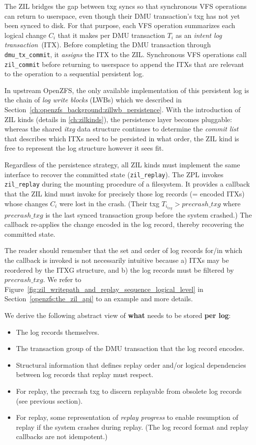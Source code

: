 \documentclass[12pt,a4paper,twoside]{book}
\begin{document}
{The ZIL bridges the gap between txg syncs so that synchronous VFS operations can return to userspace, even though their DMU transaction's txg has not yet been synced to disk.
For that purpose, each VFS operation summarizes each logical change $C_i$ that it makes per DMU transaction $T_i$ as an \textit{intent log transaction}~(ITX).
Before completing the DMU transaction through \lstinline{dmu_tx_commit}, it \textit{assigns} the ITX to the ZIL.
Synchronous VFS operations call \lstinline{zil_commit} before returning to userspace to append the ITXs that are relevant to the operation to a sequential persistent log.

In upstream OpenZFS, the only available implementation of this persistent log is the chain of \textit{log write blocks} (LWBs) which we described in Section~\ref{ch:openzfs_background:zillwb_persistence}.
With the introduction of ZIL kinds (details in \ref{ch:zilkinds}), the persistence layer becomes pluggable:
whereas the shared \textit{itxg} data structure continues to determine the \textit{commit list} that describes which ITXs need to be persisted in what order, the ZIL kind is free to represent the log structure however it sees fit.

Regardless of the persistence strategy, all ZIL kinds must implement the same interface to recover the committed state (\lstinline{zil_replay}).
The ZPL invokes \lstinline{zil_replay} during the mounting procedure of a filesystem.
It provides a callback that the ZIL kind must invoke for precisely those log records (= encoded ITXs) whose changes $C_i$ were lost in the crash.
(Their txg $T_{i_{txg}} > precrash\_txg$ where $precrash\_txg$ is the last synced transaction group before the system crashed.)
The callback re-applies the change encoded in the log record, thereby recovering the committed state.

The reader should remember that the set and order of log records for/in which the callback is invoked is not necessarily intuitive because
a) ITXs may be reordered by the ITXG structure, and b) the log records must be filtered by $precrash\_txg$.
We refer to Figure~\ref{fig:zil_writepath_and_replay_sequence_logical_level} in Section~\ref{openzfs:the_zil_api} to an example and more details.


We derive the following abstract view of \textbf{what} needs to be stored \textbf{per log}:
\begin{itemize}[noitemsep,beginpenalty=100000,midpenalty=100000]
    \item The log records themselves.
    \item The transaction group of the DMU transaction that the log record encodes.
    \item Structural information that defines replay order and/or logical dependencies between log records that replay must respect.
    \item For replay, the precrash txg to discern replayable from obsolete log records (see previous section).
    \item For replay, some representation of \textit{replay progress} to enable resumption of replay if the system crashes during replay.
        (The log record format and replay callbacks are not idempotent.)
\end{itemize}

}
\end{document}
